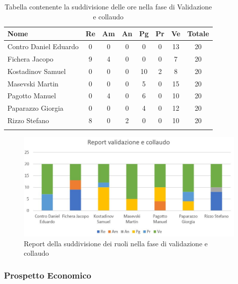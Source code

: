 \documentclass[../piano_di_progetto.tex]{subfiles}
\begin{document}
\begin{center}
	\begin{longtable}{|l|c|c|c|c|c|c|c|}
		\hline
		\rowcolor{lightgray}
		\textbf{Nome} & \textbf{Re} & \textbf{Am} & \textbf{An} & \textbf{Pg}  & \textbf{Pr}   & \textbf{Ve} & \textbf{Totale} \\

		\hline
			Contro Daniel Eduardo & 0 & 0 & 0 & 0 & 0 & 13 & 20\\
		\hline
			Fichera Jacopo & 9 & 4 & 0 & 0 & 0 & 7 & 20 \\ 
		\hline
			Kostadinov Samuel & 0 & 0 & 0 & 10 & 2 & 8 & 20 \\ 		
		\hline
			Masevski Martin & 0 & 0 & 0 & 5 & 0 & 15 & 20 \\
		\hline
			Pagotto Manuel & 0 & 4 & 0 & 6 & 0 & 10 & 20 \\			
		\hline
			Paparazzo Giorgia & 0 & 0 & 0 & 4 & 0 & 12 & 20 \\
		\hline
			Rizzo Stefano & 8 & 0 & 2 & 0 & 0 & 10 & 20 \\
		\hline	
		\rowcolor{white}
		\caption{Tabella contenente la suddivisione delle ore nella fase di Validazione e collaudo}
	\end{longtable}
\end{center}

\begin{figure}[H]
\centering
\includegraphics[width=12cm]{componenti/img/report_valid_collaudo}
\caption{Report della suddivisione dei ruoli nella fase di validazione e collaudo}
\end{figure}

\subsubsection{Prospetto Economico}
\end{document}
